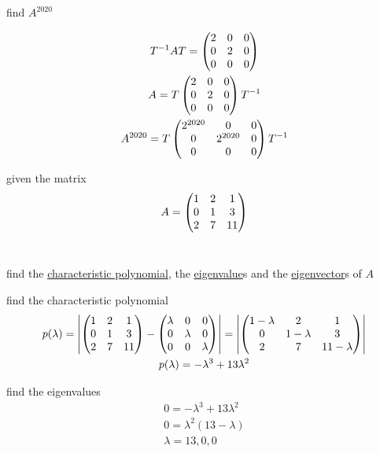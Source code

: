 \documentclass[a4paper,12pt]{article}
\begin{document}
\begin{definition}
\begin{question}
\begin{subquestion}
find \(A^{2020}\)\\
\begin{answer}
\begin{gather*}
  T^{-1}AT = \pmqty{2 & 0 & 0\\ 0 & 2 & 0\\ 0 & 0 & 0}\\
  A = T\pmqty{2 & 0 & 0\\ 0 & 2 & 0\\ 0 & 0 & 0}T^{-1}\\
  A^{2020} = T\pmqty{2^{2020} & 0 & 0\\ 0 & 2^{2020} & 0\\ 0 & 0 & 0}T^{-1}
\end{gather*}
\end{answer}
\end{subquestion}
\end{question}

\begin{question}
given the matrix\\
\[
A = \pmqty{1 & 2 & 1\\ 0 & 1 & 3\\ 2 & 7 & 11}
\]\\

\begin{subquestion}
find the \hyperref[sec:orgb773cc6]{characteristic polynomial}, the \hyperref[sec:org929d22f]{eigenvalue}s and the \hyperref[sec:org929d22f]{eigenvector}s of \(A\)\\
\begin{answer}
\begin{step}
find the characteristic polynomial\\
\begin{gather*}
  p(\lambda) = \left|\pmqty{1 & 2 & 1\\ 0 & 1 & 3\\ 2 & 7 & 11} - \pmqty{\lambda & 0 & 0\\ 0 & \lambda & 0\\ 0 & 0 & \lambda}\right| = \left|\pmqty{1-\lambda & 2 & 1\\ 0 & 1-\lambda & 3\\ 2 & 7 & 11-\lambda}\right|\\
  p(\lambda) = -\lambda^3 + 13\lambda^2
\end{gather*}
\end{step}

\begin{step}
find the eigenvalues\\
\begin{gather*}
  0 = -\lambda^3 + 13\lambda^2\\
  0 = \lambda^2(13 - \lambda)\\
  \lambda = 13,0,0
\end{gather*}
\end{step}


\end{answer}
\end{subquestion}
\end{question}
\end{definition}
\end{document}
